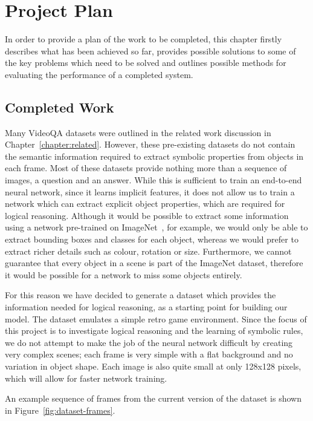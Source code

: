 \documentclass[../interim.tex]{subfiles}
\begin{document}
\chapter{Project Plan}

In order to provide a plan of the work to be completed, this chapter firstly describes what has been achieved so far, provides possible solutions to some of the key problems which need to be solved and outlines possible methods for evaluating the performance of a completed system.

\section{Completed Work}

Many VideoQA datasets were outlined in the related work discussion in Chapter~\ref{chapter:related}. However, these pre-existing datasets do not contain the semantic information required to extract symbolic properties from objects in each frame. Most of these datasets provide nothing more than a sequence of images, a question and an answer. While this is sufficient to train an end-to-end neural network, since it learns implicit features, it does not allow us to train a network which can extract explicit object properties, which are required for logical reasoning. Although it would be possible to extract some information using a network pre-trained on ImageNet~\cite{imagenet}, for example, we would only be able to extract bounding boxes and classes for each object, whereas we would prefer to extract richer details such as colour, rotation or size. Furthermore, we cannot guarantee that every object in a scene is part of the ImageNet dataset, therefore it would be possible for a network to miss some objects entirely.

For this reason we have decided to generate a dataset which provides the information needed for logical reasoning, as a starting point for building our model. The dataset emulates a simple retro game environment. Since the focus of this project is to investigate logical reasoning and the learning of symbolic rules, we do not attempt to make the job of the neural network difficult by creating very complex scenes; each frame is very simple with a flat background and no variation in object shape. Each image is also quite small at only 128x128 pixels, which will allow for faster network training.

An example sequence of frames from the current version of the dataset is shown in Figure~\ref{fig:dataset-frames}.
\end{document}
